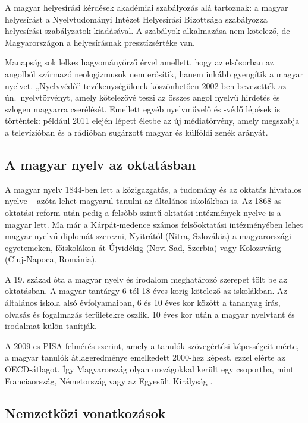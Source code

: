 \begin{multicols}{2}
A magyar helyesírási kérdések akadémiai szabályozás alá tartoznak: a magyar helyesírást a Nyelvtudományi Intézet He\-lyes\-írá\-si Bizottsága szabályozza helyesírási szabályzatok kiadásával. A szabályok alkalmazása nem kötelező, de Magyarországon a helyesírásnak presz\-tízs\-ér\-té\-ke van.

Manapság sok lelkes hagyományőrző érvel amellett, hogy az elsősorban az angolból származó neologizmusok nem erősítik, hanem inkább gyengítik a magyar nyelvet. „Nyelvvédő” tevékenységüknek köszönhetően 2002-ben bevezették az ún.\ nyelv\-tör\-vényt, amely kötelezővé teszi az összes angol nyelvű hirdetés és szlogen magyarra cserélését. Emellett egyéb nyelvművelő és -védő lépések is történtek: például 2011 elején lépett életbe az új mé\-dia\-tör\-vény, amely megszabja a televízióban és a rádióban sugárzott magyar és külföldi zenék arányát.

\subsection{A magyar nyelv az oktatásban}

A magyar nyelv 1844-ben lett a közigazgatás, a tudomány és az oktatás hivatalos nyelve -- azóta lehet magyarul tanulni az általános iskolákban is. Az 1868-as oktatási reform után pedig a felsőbb szintű oktatási intézmények nyelve is a magyar lett. Ma már a Kárpát-medence számos felsőoktatási intézményében lehet ma\-gyar nyelvű diplomát szerezni, Nyitrától (Nit\-ra, Szlovákia) a magyarországi egyetemeken, főiskolákon át Újvidékig (Novi Sad, Szerbia) vagy Kolozsvárig (Cluj-Napoca, Románia). 

A 19. század óta a magyar nyelv és irodalom meghatározó szerepet tölt be az oktatásban. A magyar tantárgy 6-tól 18 éves korig kötelező az iskolákban. Az általános iskola alsó évfolyamaiban, 6 és 10 éves kor között a tananyag írás, olvasás és fogalmazás területekre oszlik. 10 éves kor után a magyar nyelvtant és irodalmat külön tanítják.  

A 2009-es PISA felmérés  szerint, amely a tanulók szövegértési képességeit mérte, a magyar tanulók átlageredménye emel\-ke\-dett 2000-hez képest, ezzel elérte az OECD-átlagot. Így Magyarország olyan országokkal került egy csoportba, mint Franciaország, Németország vagy az Egye\-sült Királyság \cite{pisa}.    

\subsection{Nemzetközi vonatkozások}


\end{multicols}
